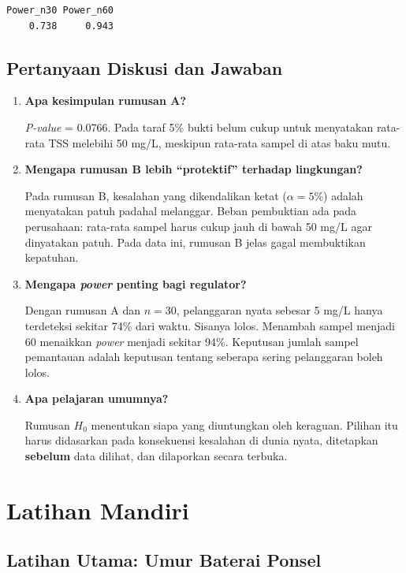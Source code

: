\documentclass[
  indonesian,
  letterpaper,
]{book}
\begin{document}
\begin{verbatim}
Power_n30 Power_n60 
    0.738     0.943 
\end{verbatim}

\section{Pertanyaan Diskusi dan
Jawaban}\label{pertanyaan-diskusi-dan-jawaban-1}

\begin{enumerate}
\def\labelenumi{\arabic{enumi}.}
\item
  \textbf{Apa kesimpulan rumusan A?}

  \emph{P-value} = 0.0766. Pada taraf 5\% bukti belum cukup untuk
  menyatakan rata-rata TSS melebihi 50 mg/L, meskipun rata-rata sampel
  di atas baku mutu.
\item
  \textbf{Mengapa rumusan B lebih ``protektif'' terhadap lingkungan?}

  Pada rumusan B, kesalahan yang dikendalikan ketat (\(\alpha = 5\%\))
  adalah menyatakan patuh padahal melanggar. Beban pembuktian ada pada
  perusahaan: rata-rata sampel harus cukup jauh di bawah 50 mg/L agar
  dinyatakan patuh. Pada data ini, rumusan B jelas gagal membuktikan
  kepatuhan.
\item
  \textbf{Mengapa \emph{power} penting bagi regulator?}

  Dengan rumusan A dan \(n = 30\), pelanggaran nyata sebesar 5 mg/L
  hanya terdeteksi sekitar 74\% dari waktu. Sisanya lolos. Menambah
  sampel menjadi 60 menaikkan \emph{power} menjadi sekitar 94\%.
  Keputusan jumlah sampel pemantauan adalah keputusan tentang seberapa
  sering pelanggaran boleh lolos.
\item
  \textbf{Apa pelajaran umumnya?}

  Rumusan \(H_0\) menentukan siapa yang diuntungkan oleh keraguan.
  Pilihan itu harus didasarkan pada konsekuensi kesalahan di dunia
  nyata, ditetapkan \textbf{sebelum} data dilihat, dan dilaporkan secara
  terbuka.
\end{enumerate}


\chapter{Latihan Mandiri}\label{latihan-mandiri}

\section{Latihan Utama: Umur Baterai
Ponsel}\label{latihan-utama-umur-baterai-ponsel}
\end{document}
